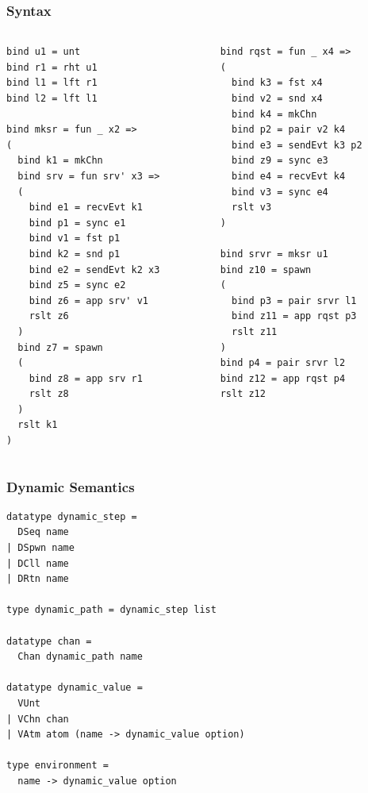 \documentclass{beamer}
\begin{document}
\begin{frame}[fragile]
	\frametitle{Syntax}
\begin{columns}
\begin{column}{0.5\textwidth}
\begin{lstlisting}[language=normal_lang, mathescape]
bind u1 = unt
bind r1 = rht u1
bind l1 = lft r1
bind l2 = lft l1

bind mksr = fun _ x2 => 
(
  bind k1 = mkChn
  bind srv = fun srv' x3 =>
  (
    bind e1 = recvEvt k1
    bind p1 = sync e1
    bind v1 = fst p1
    bind k2 = snd p1 
    bind e2 = sendEvt k2 x3
    bind z5 = sync e2
    bind z6 = app srv' v1
    rslt z6 
  )
  bind z7 = spawn
  (
    bind z8 = app srv r1
    rslt z8 
  )
  rslt k1
)
\end{lstlisting}
\end{column}

\begin{column}{0.5\textwidth}
\begin{lstlisting}[language=normal_lang, mathescape]
bind rqst = fun _ x4 =>
(
  bind k3 = fst x4
  bind v2 = snd x4
  bind k4 = mkChn
  bind p2 = pair v2 k4
  bind e3 = sendEvt k3 p2
  bind z9 = sync e3
  bind e4 = recvEvt k4
  bind v3 = sync e4
  rslt v3
)

bind srvr = mksr u1
bind z10 = spawn
( 
  bind p3 = pair srvr l1
  bind z11 = app rqst p3
  rslt z11
)
bind p4 = pair srvr l2
bind z12 = app rqst p4
rslt z12
\end{lstlisting}
\end{column}
\end{columns}
\end{frame}

\begin{frame}[fragile]
\frametitle{Dynamic Semantics}
\begin{lstlisting}[language=logic, mathescape]
datatype dynamic_step =
  DSeq name
| DSpwn name
| DCll name
| DRtn name 

type dynamic_path = dynamic_step list

datatype chan =
  Chan dynamic_path name 

datatype dynamic_value = 
  VUnt
| VChn chan
| VAtm atom (name -> dynamic_value option)

type environment =
  name -> dynamic_value option
\end{lstlisting}
\end{frame}
\end{document}
